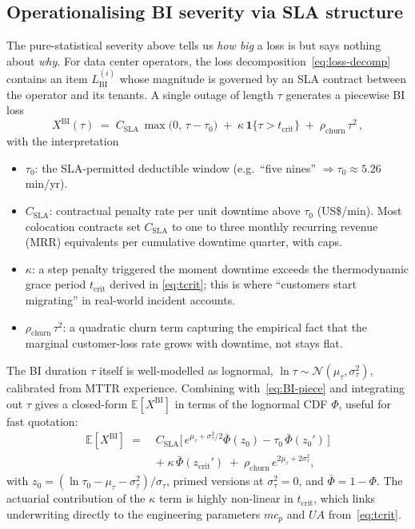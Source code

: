 \documentclass[11pt,a4paper]{article}
\theoremstyle{ia}
\newcommand{\E}{\mathbb{E}}
\newcommand{\1}{\mathbf{1}}
\begin{document}
\subsection{Operationalising BI severity via SLA structure}
\label{ss:BI-SLA}

The pure-statistical severity above tells us \emph{how big} a loss is
but says nothing about \emph{why}. For data center operators, the
loss decomposition~\eqref{eq:loss-decomp} contains an item
$L^{(i)}_{\mathrm{BI}}$ whose magnitude is governed by an SLA contract
between the operator and its tenants. A single outage of length
$\tau$ generates a piecewise BI loss
\begin{equation}\label{eq:BI-piece}
   \boxed{\;
   X^{\mathrm{BI}}(\tau) \;=\;
   C_{\mathrm{SLA}}\,\max\!\bigl(0,\,\tau-\tau_0\bigr)
   \;+\; \kappa\,\1\{\tau > t_{\mathrm{crit}}\}
   \;+\; \rho_{\mathrm{churn}}\,\tau^2 \,,\;}
\end{equation}
with the interpretation
\begin{itemize}[leftmargin=*,nosep]
  \item $\tau_0$: the SLA-permitted deductible window
        (e.g.\ ``five nines'' $\Rightarrow \tau_0\approx 5.26$\,min/yr).
  \item $C_{\mathrm{SLA}}$: contractual penalty rate per unit downtime
        above $\tau_0$ (US\$/min). Most colocation contracts set
        $C_{\mathrm{SLA}}$ to one to three monthly recurring revenue (MRR)
        equivalents per cumulative downtime quarter, with caps.
  \item $\kappa$: a step penalty triggered the moment downtime exceeds
        the thermodynamic grace period $t_{\mathrm{crit}}$ derived in
        \eqref{eq:tcrit}; this is where ``customers start migrating''
        in real-world incident accounts.
  \item $\rho_{\mathrm{churn}}\,\tau^2$: a quadratic churn term
        capturing the empirical fact that the marginal customer-loss
        rate grows with downtime, not stays flat.
\end{itemize}

\noindent The BI duration $\tau$ itself is well-modelled as
lognormal, $\ln\tau\sim\mathcal{N}(\mu_\tau,\sigma_\tau^2)$, calibrated
from MTTR experience. Combining with~\eqref{eq:BI-piece} and integrating
out $\tau$ gives a closed-form $\E[X^{\mathrm{BI}}]$ in terms of the
lognormal CDF $\Phi$, useful for fast quotation:
\begin{equation}\label{eq:BI-mean}
\begin{aligned}
   \E[X^{\mathrm{BI}}] \;=\;{}&
   C_{\mathrm{SLA}}\bigl[\,e^{\mu_\tau+\sigma_\tau^2/2}\bar\Phi(z_0)
     - \tau_0\,\bar\Phi(z_0')\,\bigr] \\[2pt]
   &+\;\kappa\,\bar\Phi(z_{\mathrm{crit}}')
   \;+\;\rho_{\mathrm{churn}}\,e^{2\mu_\tau+2\sigma_\tau^2},
\end{aligned}
\end{equation}
with $z_0=(\ln\tau_0-\mu_\tau-\sigma_\tau^2)/\sigma_\tau$, primed
versions at $\sigma_\tau^2=0$, and $\bar\Phi=1-\Phi$. The actuarial
contribution of the $\kappa$ term is highly non-linear in
$t_{\mathrm{crit}}$, which links underwriting directly to the
engineering parameters $m c_p$ and $UA$ from~\eqref{eq:tcrit}.
\end{document}

